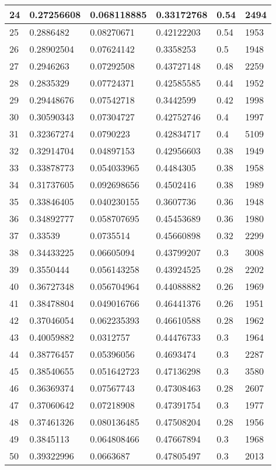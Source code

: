 \begin{longtable}{|l|l|l|l|l|l|}
24 & 0.27256608 & 0.068118885 & 0.33172768 & 0.54 & 2494 \\ \hline 
25 & 0.2886482 & 0.08270671 & 0.42122203 & 0.54 & 1953 \\ \hline 
26 & 0.28902504 & 0.07624142 & 0.3358253 & 0.5 & 1948 \\ \hline 
27 & 0.2946263 & 0.07292508 & 0.43727148 & 0.48 & 2259 \\ \hline 
28 & 0.2835329 & 0.07724371 & 0.42585585 & 0.44 & 1952 \\ \hline 
29 & 0.29448676 & 0.07542718 & 0.3442599 & 0.42 & 1998 \\ \hline 
30 & 0.30590343 & 0.07304727 & 0.42752746 & 0.4 & 1997 \\ \hline 
31 & 0.32367274 & 0.0790223 & 0.42834717 & 0.4 & 5109 \\ \hline 
32 & 0.32914704 & 0.04897153 & 0.42956603 & 0.38 & 1949 \\ \hline 
33 & 0.33878773 & 0.054033965 & 0.4484305 & 0.38 & 1958 \\ \hline 
34 & 0.31737605 & 0.092698656 & 0.4502416 & 0.38 & 1989 \\ \hline 
35 & 0.33846405 & 0.040230155 & 0.3607736 & 0.36 & 1948 \\ \hline 
36 & 0.34892777 & 0.058707695 & 0.45453689 & 0.36 & 1980 \\ \hline 
37 & 0.33539 & 0.0735514 & 0.45660898 & 0.32 & 2299 \\ \hline 
38 & 0.34433225 & 0.06605094 & 0.43799207 & 0.3 & 3008 \\ \hline 
39 & 0.3550444 & 0.056143258 & 0.43924525 & 0.28 & 2202 \\ \hline 
40 & 0.36727348 & 0.056704964 & 0.44088882 & 0.26 & 1969 \\ \hline 
41 & 0.38478804 & 0.049016766 & 0.46441376 & 0.26 & 1951 \\ \hline 
42 & 0.37046054 & 0.062235393 & 0.46610588 & 0.28 & 1962 \\ \hline 
43 & 0.40059882 & 0.0312757 & 0.44476733 & 0.3 & 1964 \\ \hline 
44 & 0.38776457 & 0.05396056 & 0.4693474 & 0.3 & 2287 \\ \hline 
45 & 0.38540655 & 0.051642723 & 0.47136298 & 0.3 & 3580 \\ \hline 
46 & 0.36369374 & 0.07567743 & 0.47308463 & 0.28 & 2607 \\ \hline 
47 & 0.37060642 & 0.07218908 & 0.47391754 & 0.3 & 1977 \\ \hline 
48 & 0.37461326 & 0.080136485 & 0.47508204 & 0.28 & 1956 \\ \hline 
49 & 0.3845113 & 0.064808466 & 0.47667894 & 0.3 & 1968 \\ \hline 
50 & 0.39322996 & 0.0663687 & 0.47805497 & 0.3 & 2013 \\ \hline 
\end{longtable}